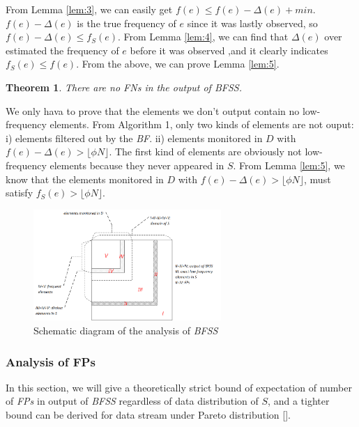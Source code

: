 \documentclass[conference]{IEEEtran}
\begin{document}
\begin{IEEEproof}
From Lemma \ref{lem:3}, we can easily get $f(e)\leq f(e)-\Delta(e)+min$. $f(e)-\Delta(e)$ is the true frequency of $e$ since it was lastly observed, so $f(e)-\Delta(e)\leq f_S(e)$. From Lemma \ref{lem:4}, we can find that $\Delta(e)$ over estimated the frequency of $e$ before it was observed ,and it clearly indicates $f_S(e)\leq f(e)$. From the above, we can prove Lemma \ref{lem:5}.
\end{IEEEproof}

\newtheorem{theorem}{Theorem}
\begin{theorem}\label{thm:1}
	There are no \emph{FNs} in the output of \emph{BFSS}.
\end{theorem}

\begin{IEEEproof}
We only hava to prove that the elements we don't output contain no low-frequency elements. From Algorithm 1, only two kinds of elements are not ouput: i) elements filtered out by the \emph{BF}. ii) elements monitored in $D$ with $f(e)-\Delta(e)>\lfloor \phi N\rfloor$. The first kind of elements are obviously not low-frequency elements because they never appeared in $S$. From Lemma \ref{lem:5}, we know that the elements monitored in $D$ with $f(e)-\Delta(e)>\lfloor \phi N\rfloor$, must satisfy $f_S(e)>\lfloor \phi N\rfloor$. 
\end{IEEEproof}

\begin{figure}
	\centering
	\includegraphics[width=2.8in]{png/bfss.png}
	\caption{Schematic diagram of the analysis of \emph{BFSS}}
	\label{fig:bfss}
\end{figure}

\subsubsection{\textbf{Analysis of FPs}}
In this section, we will give a theoretically strict bound of expectation of number of \emph{FPs} in output of \emph{BFSS} regardless of data distribution of $S$, and a tighter bound can be derived for data stream under Pareto distribution [].
\end{document}
